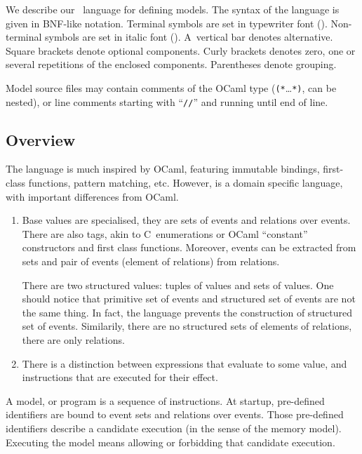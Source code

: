 We describe our \cat{}~language for defining models.
The syntax of the language is given in BNF-like notation. Terminal
symbols are set in typewriter font ().
Non-terminal symbols are set in italic font ().
A~vertical bar \synt{\ldots\orelse\ldots}
denotes alternative.
Square brackets \synt{\boption{}\ldots\eoption{}} denote optional components. Curly brackets
\synt{\brepet{}\ldots\erepet{}} denotes zero,
one or several repetitions of the enclosed
components.
Parentheses \synt{\bparen{}\ldots\eparen{}} denote grouping.


Model source files may contain comments of the OCaml type
(\verb+(*+\ldots \verb+*)+, can be nested), or line comments starting with
``\verb+//+'' and running until end of line.

\subsection{\label{overview}Overview}
The \cat{} language is much inspired by OCaml, featuring immutable bindings,
first-class functions, pattern matching, etc.
However, \cat{} is a domain specific language, with important differences
from OCaml.
\begin{enumerate}
\item
Base values are specialised, they are sets of events and relations
over events. There are also tags, akin to C~enumerations or OCaml
``constant'' constructors and first class functions. Moreover, events
can be extracted from sets and pair of events (element of relations)
from relations.

There are two structured values: tuples of values and sets of values.
One should notice that primitive set of events and structured set of events are not the same
thing. In fact, the language prevents the construction of structured set of events.
Similarily, there are no structured sets of elements of relations, there are only relations.

\item There is a distinction between expressions that evaluate
to some value, and instructions that are executed for their effect.
\end{enumerate}
A model, or \cat{} program is a sequence of instructions.
At startup, pre-defined identifiers are bound to event sets and relations
over events.
Those pre-defined identifiers describe a candidate execution
(in the sense of the memory model).
Executing the model means allowing or forbidding that candidate
execution.


